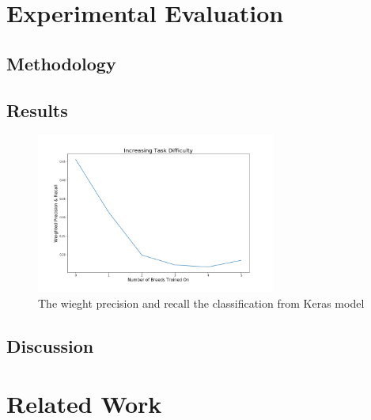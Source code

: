 \documentclass[12pt]{article}
\begin{document}
\section{Experimental Evaluation}
\subsection{Methodology}

\subsection{Results}
 \begin{figure}[h!]
 \centering
  \includegraphics[width=0.7\textwidth]{results}
  \caption{The wieght precision and recall the classification from Keras model}
  \end{figure}
\subsection{Discussion}

 
\section{Related Work}
\end{document}
